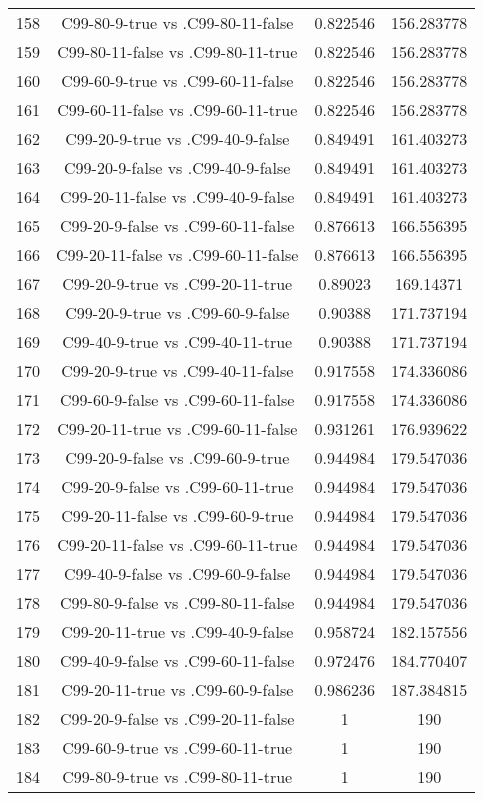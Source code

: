 \documentclass[a4paper,10pt]{article}
\begin{document}
\begin{landscape}
\begin{table}[!htp]
\begin{tabular}{cccc}
158&C99-80-9-true vs .C99-80-11-false&0.822546&156.283778\\
159&C99-80-11-false vs .C99-80-11-true&0.822546&156.283778\\
160&C99-60-9-true vs .C99-60-11-false&0.822546&156.283778\\
161&C99-60-11-false vs .C99-60-11-true&0.822546&156.283778\\
162&C99-20-9-true vs .C99-40-9-false&0.849491&161.403273\\
163&C99-20-9-false vs .C99-40-9-false&0.849491&161.403273\\
164&C99-20-11-false vs .C99-40-9-false&0.849491&161.403273\\
165&C99-20-9-false vs .C99-60-11-false&0.876613&166.556395\\
166&C99-20-11-false vs .C99-60-11-false&0.876613&166.556395\\
167&C99-20-9-true vs .C99-20-11-true&0.89023&169.14371\\
168&C99-20-9-true vs .C99-60-9-false&0.90388&171.737194\\
169&C99-40-9-true vs .C99-40-11-true&0.90388&171.737194\\
170&C99-20-9-true vs .C99-40-11-false&0.917558&174.336086\\
171&C99-60-9-false vs .C99-60-11-false&0.917558&174.336086\\
172&C99-20-11-true vs .C99-60-11-false&0.931261&176.939622\\
173&C99-20-9-false vs .C99-60-9-true&0.944984&179.547036\\
174&C99-20-9-false vs .C99-60-11-true&0.944984&179.547036\\
175&C99-20-11-false vs .C99-60-9-true&0.944984&179.547036\\
176&C99-20-11-false vs .C99-60-11-true&0.944984&179.547036\\
177&C99-40-9-false vs .C99-60-9-false&0.944984&179.547036\\
178&C99-80-9-false vs .C99-80-11-false&0.944984&179.547036\\
179&C99-20-11-true vs .C99-40-9-false&0.958724&182.157556\\
180&C99-40-9-false vs .C99-60-11-false&0.972476&184.770407\\
181&C99-20-11-true vs .C99-60-9-false&0.986236&187.384815\\
182&C99-20-9-false vs .C99-20-11-false&1&190\\
183&C99-60-9-true vs .C99-60-11-true&1&190\\
184&C99-80-9-true vs .C99-80-11-true&1&190\\

\end{tabular}
\end{table}
\end{landscape}
\end{document}
